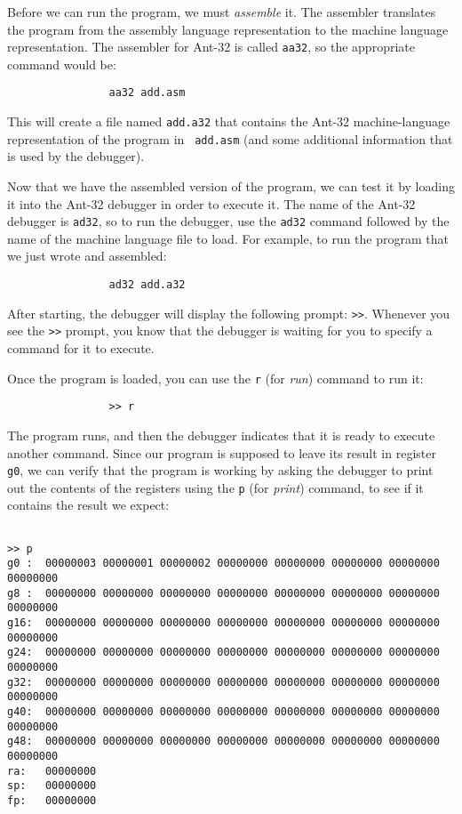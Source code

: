 Before we can run the program, we must {\em assemble} it.  The
assembler translates the program from the assembly language
representation to the machine language representation.  The assembler
for Ant-32 is called {\tt aa32}, so the appropriate command
would be:

\begin{verbatim}
                aa32 add.asm
\end{verbatim}

This will create a file named {\tt add.a32} that contains the
Ant-32 machine-language representation of the program in {\tt
add.asm} (and some additional information that is used by the
debugger).

Now that we have the assembled version of the program, we can test it
by loading it into the Ant-32 debugger in order to execute it. 
The name of the Ant-32 debugger is {\tt ad32}, so to run the
debugger, use the {\tt ad32} command followed by the name of the machine
language file to load.  For example, to run the program that we just
wrote and assembled:

\begin{verbatim}
                ad32 add.a32
\end{verbatim}

After starting, the debugger will display the following
prompt: {\tt >>}.
Whenever you see the {\tt >>} prompt, you know that the debugger
is waiting for you to specify a command for it to execute.

Once the program is loaded, you can use the {\tt r} (for {\em run})
command to run it:
\begin{verbatim}
                >> r
\end{verbatim}

The program runs, and then the debugger indicates that it is ready to
execute another command.  Since our program is supposed to
leave its result in register {\tt g0}, we can verify that the
program is working by asking the debugger to print out the contents of
the registers using the {\tt p} (for {\em print}) command,
to see if it contains the result we expect:

{\codesize
\begin{verbatim}

>> p 
g0 :  00000003 00000001 00000002 00000000 00000000 00000000 00000000 00000000
g8 :  00000000 00000000 00000000 00000000 00000000 00000000 00000000 00000000
g16:  00000000 00000000 00000000 00000000 00000000 00000000 00000000 00000000
g24:  00000000 00000000 00000000 00000000 00000000 00000000 00000000 00000000
g32:  00000000 00000000 00000000 00000000 00000000 00000000 00000000 00000000
g40:  00000000 00000000 00000000 00000000 00000000 00000000 00000000 00000000
g48:  00000000 00000000 00000000 00000000 00000000 00000000 00000000 00000000
ra:   00000000
sp:   00000000
fp:   00000000
\end{verbatim}}

